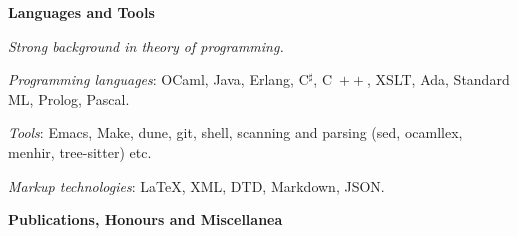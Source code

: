 \documentclass[a4paper,11pt]{article}
\newcommand{\cpp}{\mbox{C \hspace*{-2.5mm} \raise 0.7mm \hbox{${\scriptscriptstyle ++}$}}}
\begin{document}
\bigskip
\noindent\textbf{\large Languages and Tools}
\medskip
\begin{itemize*}

  \item \textit{Strong background in theory of programming.}

  \item \textit{Programming languages}: OCaml, Java, Erlang,
    C$^\sharp$, \cpp, XSLT, Ada, Standard ML, Prolog, Pascal.

  \item \textit{Tools}: Emacs, Make, dune, git, shell, scanning and
    parsing (sed, ocamllex, menhir, tree-sitter) etc.

  \item \textit{Markup technologies}: \LaTeX, XML, DTD, Markdown,
    JSON.







\end{itemize*}

\bigskip
\noindent\textbf{\large Publications, Honours and Miscellanea}

\bigskip
\end{document}
